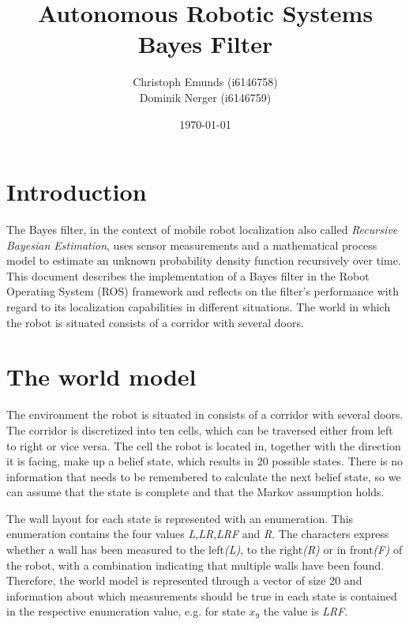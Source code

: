 \documentclass[10pt,a4paper]{article}
\author{Christoph Emunds (i6146758)\\Dominik Nerger (i6146759)}
\title{Autonomous Robotic Systems\\Bayes Filter}
\date{\today}
\begin{document}
	\maketitle
	
	\tableofcontents
	
	\section{Introduction}
	The Bayes filter, in the context of mobile robot localization also called \textit{Recursive Bayesian Estimation}, uses sensor measurements and a mathematical process model to estimate an unknown probability density function recursively over time.	This document describes the implementation of a Bayes filter in the Robot Operating System (ROS) framework and reflects on the filter's performance with regard to its localization capabilities in different situations. The world in which the robot is situated consists of a corridor with several doors.
	
		
	\section{The world model}
	The environment the robot is situated in consists of a corridor with several doors. The corridor is discretized into ten cells, which can be traversed either from left to right or vice versa. The cell the robot is located in, together with the direction it is facing, make up a belief state, which results in 20 possible states. There is no information that needs to be remembered to calculate the next belief state, so we can assume that the state is complete and that the Markov assumption holds.
	
	
	The wall layout for each state is represented with an enumeration. This enumeration contains the four values \textit{L},\textit{LR},\textit{LRF} and \textit{R}. The characters express whether a wall has been measured to the left\textit{(L)}, to the right\textit{(R)} or in front\textit{(F)} of the robot, with a combination indicating that multiple walls have been found. Therefore, the world model is represented through a vector of size 20 and information about which measurements should be true in each state is contained in the respective enumeration value, e.g. for state $x_9$ the value is \textit{LRF}.
	
\end{document}
